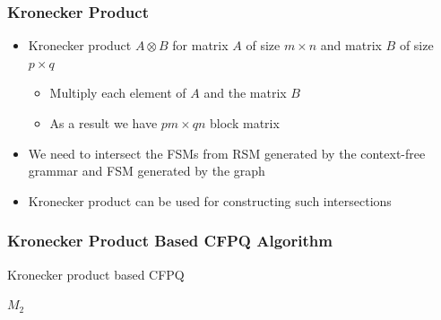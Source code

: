 \documentclass[xcolor=table]{beamer}
\begin{document}
\begin{frame}[fragile] \frametitle{Kronecker Product}
\begin{itemize}
	\item Kronecker product $A \otimes B$ for matrix $A$ of size $m \times n$ and matrix $B$ of size $p \times q$
	\begin{itemize}
		\item Multiply each element of $A$ and the matrix $B$
		\item As a result we have $pm \times qn$ block matrix
	\end{itemize}
	\item We need to intersect the FSMs from RSM generated by the context-free grammar and FSM generated by the graph
	\item Kronecker product can be used for constructing such intersections
\end{itemize}

\end{frame}

\begin{frame}[fragile] \frametitle{Kronecker Product Based CFPQ Algorithm}

\begin{algorithm}[H]
	{\footnotesize
\begin{algorithmic}[1]
	\caption{Kronecker product based CFPQ}
	\label{tensor:cfpq}
	\EndFor
	\EndFor
	\EndIf
	\EndIf
	\EndFor
	\EndFor
	\EndWhile
	\State \Return $M_2$
	\EndFunction
\end{algorithmic}
}
\end{algorithm}


\end{frame}
\end{document}
